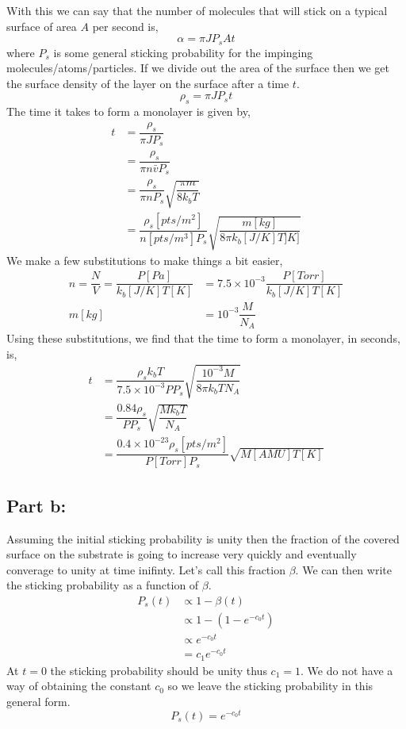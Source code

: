 \documentclass[12pt]{article}
\renewcommand{\=}[1]{\stackrel{#1}{=}} %
\theoremstyle{definition}
\theoremstyle{remark}
\begin{document}
With this we can say that the number of molecules that will stick on a typical surface of area $A$ per second is,
\[
	\alpha = \pi J P_s At
\]
where $P_s$ is some general sticking probability for the impinging molecules/atoms/particles. If we divide out the area of the surface then we get the surface density of the layer on the surface after a time $t$.
\[
	\rho_s = \pi JP_s t
\]
The time it takes to form a monolayer is given by,
\begin{align*}
	t &= \dfrac{\rho_s}{\pi JP_s}\\[3mm]
		&= \dfrac{\rho_s}{\pi n\bar{v} P_s}\\[3mm]
		&= \dfrac{\rho_s}{\pi n P_s}\sqrt{\dfrac{\pi m}{8k_bT}}\\[3mm]
		&= \dfrac{\rho_{s}[pts/m^2]}{n[pts/m^3]P_s}\sqrt{\dfrac{m[kg]}{8\pi k_b[J/K] T]K]}}
\end{align*}
We make a few substitutions to make things a bit easier,
\begin{align*}
	n = \dfrac{N}{V} = \dfrac{P[Pa]}{k_b[J/K] T[K]} &= 7.5\times10^{-3} \dfrac{P[Torr]}{k_b[J/K]T[K]}\\[3mm]
	m[kg] &= 10^{-3}\dfrac{M}{N_A}
\end{align*}
Using these substitutions, we find that the time to form a monolayer, in seconds, is,
\begin{align*}
	t &= \dfrac{\rho_sk_b T}{7.5\times10^{-3}PP_s}\sqrt{\dfrac{10^{-3}M}{8\pi k_bTN_A}}\\[3mm]
		&= \dfrac{0.84 \rho_s }{PP_s}\sqrt{\dfrac{Mk_bT}{N_A}}\\[3mm]
		&= \dfrac{0.4\times10^{-23}\rho_s[pts/m^2]}{P[Torr]P_s}\sqrt{M[AMU]T[K]}
\end{align*}


\subsection*{Part b:}

Assuming the initial sticking probability is unity then the fraction of the covered surface on the substrate is going to increase very quickly and eventually converage to unity at time inifinty. Let's call this fraction $\beta$. We can then write the sticking probability as a function of $\beta$.
\begin{align*}
	P_s(t) &\propto 1-\beta(t)\\[3mm]
		&\propto 1-\left(1-e^{-c_0t}\right)\\[3mm]
		&\propto e^{-c_0t}\\[3mm]
		&= c_1e^{-c_0t}
\end{align*}
At $t=0$ the sticking probability should be unity thus $c_1=1$. We do not have a way of obtaining the constant $c_0$ so we leave the sticking probability in this general form.
\[
	P_s(t) = e^{-c_0t}
\]
\end{document}
